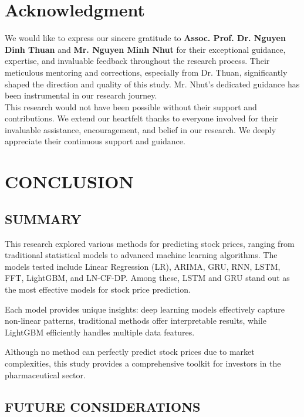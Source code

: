 \documentclass{ieeeojies}
\begin{document}
\vspace{-1em}

\section*{Acknowledgment}
We would like to express our sincere gratitude to \textbf{Assoc. Prof. Dr. Nguyen Dinh Thuan} and \textbf{Mr. Nguyen Minh Nhut} for their exceptional guidance, expertise, and invaluable feedback throughout the research process. Their meticulous mentoring and corrections, especially from Dr. Thuan, significantly shaped the direction and quality of this study. Mr. Nhut's dedicated guidance has been instrumental in our research journey.
\\This research would not have been possible without their support and contributions. We extend our heartfelt thanks to everyone involved for their invaluable assistance, encouragement, and belief in our research. We deeply appreciate their continuous support and guidance.

\section{CONCLUSION}

\subsection{SUMMARY}

This research explored various methods for predicting stock prices, ranging from traditional statistical models to advanced machine learning algorithms. The models tested include Linear Regression (LR), ARIMA, GRU, RNN, LSTM, FFT, LightGBM, and LN-CF-DP. Among these, LSTM and GRU stand out as the most effective models for stock price prediction.

Each model provides unique insights: deep learning models effectively capture non-linear patterns, traditional methods offer interpretable results, while LightGBM efficiently handles multiple data features.

Although no method can perfectly predict stock prices due to market complexities, this study provides a comprehensive toolkit for investors in the pharmaceutical sector.

\subsection{FUTURE CONSIDERATIONS}
\end{document}

